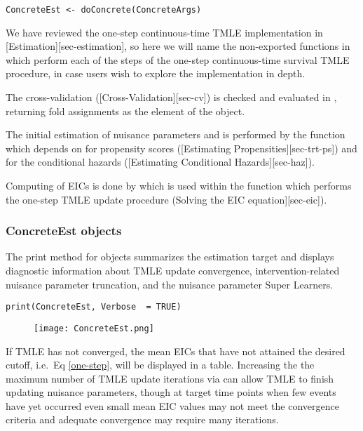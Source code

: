 \begin{verbatim}
ConcreteEst <- doConcrete(ConcreteArgs)
\end{verbatim}

We have reviewed the one-step continuous-time TMLE implementation in {[}Estimation{]}{[}sec-estimation{]}, so here we will name the non-exported functions in  which perform each of the steps of the one-step continuous-time survival TMLE procedure, in case users wish to explore the implementation in depth.

The cross-validation ({[}Cross-Validation{]}{[}sec-cv{]}) is checked and evaluated in , returning fold assignments as the  element of the  object.

The initial estimation of nuisance parameters and is performed by the function  which depends on  for propensity scores ({[}Estimating Propensities{]}{[}sec-trt-ps{]}) and  for the conditional hazards ({[}Estimating Conditional Hazards{]}{[}sec-haz{]}).

Computing of EICs is done by  which is used within the  function which performs the one-step TMLE update procedure (Solving the EIC equation{]}{[}sec-eic{]}).

\hypertarget{sec-concreteest}{%
\subsubsection{ConcreteEst objects}\label{sec-concreteest}}

The print method for  objects summarizes the estimation target and displays diagnostic information about TMLE update convergence, intervention-related nuisance parameter truncation, and the nuisance parameter Super Learners.

\begin{verbatim}
print(ConcreteEst, Verbose  = TRUE)
\end{verbatim}

\begin{figure}[H]
\center
\texttt{[image: ConcreteEst.png]}
\end{figure}

If TMLE has not converged, the mean EICs that have not attained the desired cutoff, i.e.~Eq \eqref{one-step}, will be displayed in a table. Increasing the the maximum number of TMLE update iterations via  can allow TMLE to finish updating nuisance parameters, though at target time points when few events have yet occurred even small mean EIC values may not meet the convergence criteria and adequate convergence may require many iterations.

